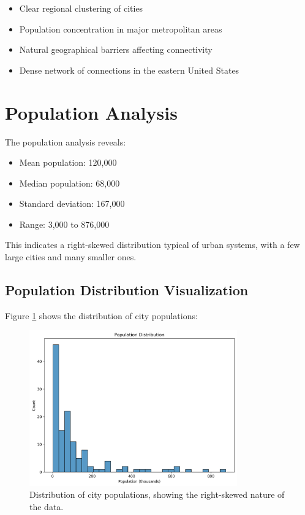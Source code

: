 \begin{itemize}
    \item Clear regional clustering of cities
    \item Population concentration in major metropolitan areas
    \item Natural geographical barriers affecting connectivity
    \item Dense network of connections in the eastern United States
\end{itemize}

\section{Population Analysis}
The population analysis reveals:
\begin{itemize}
    \item Mean population: 120,000
    \item Median population: 68,000
    \item Standard deviation: 167,000
    \item Range: 3,000 to 876,000
\end{itemize}

This indicates a right-skewed distribution typical of urban systems, with a few large cities and many smaller ones.

\subsection{Population Distribution Visualization}
Figure \ref{fig:pop_dist} shows the distribution of city populations:

\begin{figure}[H]
    \centering
    \includegraphics[width=0.8\textwidth]{figures/population_distribution.png}
    \caption{Distribution of city populations, showing the right-skewed nature of the data.}
    \label{fig:pop_dist}
\end{figure}

